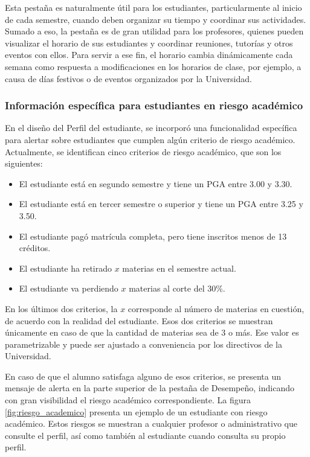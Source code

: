 Esta pestaña es naturalmente útil para los estudiantes, particularmente al inicio de cada semestre, cuando deben organizar su tiempo y coordinar sus actividades. Sumado a eso, la pestaña es de gran utilidad para los profesores, quienes pueden visualizar el horario de sus estudiantes y coordinar reuniones, tutorías y otros eventos con ellos. Para servir a ese fin, el horario cambia dinámicamente cada semana como respuesta a modificaciones en los horarios de clase, por ejemplo, a causa de días festivos o de eventos organizados por la Universidad.

\subsubsection{Información específica para estudiantes en riesgo académico}

En el diseño del Perfil del estudiante, se incorporó una funcionalidad específica para alertar sobre estudiantes que cumplen algún criterio de riesgo académico. Actualmente, se identifican cinco criterios de riesgo académico, que son los siguientes:
\begin{itemize}
	\item El estudiante está en segundo semestre y tiene un PGA entre 3.00 y 3.30.
	\item El estudiante está en tercer semestre o superior y tiene un PGA entre 3.25 y 3.50.
	\item El estudiante pagó matrícula completa, pero tiene inscritos menos de 13 créditos.
	\item El estudiante ha retirado $x$ materias en el semestre actual.
	\item El estudiante va perdiendo $x$ materias al corte del 30\%.
\end{itemize}

En los últimos dos criterios, la $x$ corresponde al número de materias en cuestión, de acuerdo con la realidad del estudiante. Esos dos criterios se muestran únicamente en caso de que la cantidad de materias sea de 3 o más. Ese valor es parametrizable y puede ser ajustado a conveniencia por los directivos de la Universidad.

En caso de que el alumno satisfaga alguno de esos criterios, se presenta un mensaje de alerta en la parte superior de la pestaña de Desempeño, indicando con gran visibilidad el riesgo académico correspondiente. La figura \ref{fig:riesgo_academico} presenta un ejemplo de un estudiante con riesgo académico. Estos riesgos se muestran a cualquier profesor o administrativo que consulte el perfil, así como también al estudiante cuando consulta su propio perfil.

